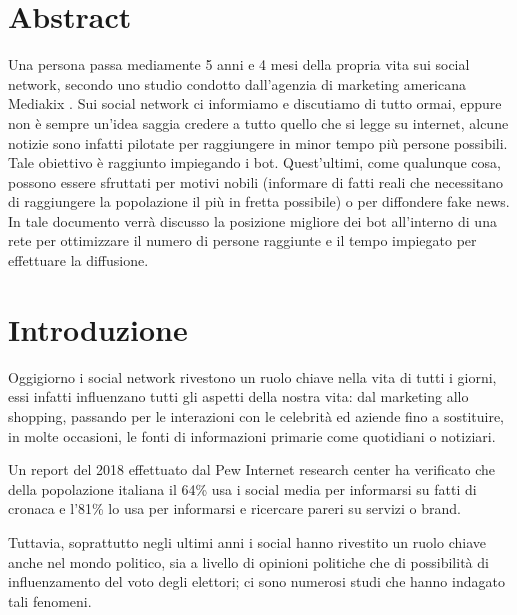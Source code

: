 \documentclass[11pt]{article}
\begin{document}
\newcommand{\CC}{C\nolinebreak\hspace{-.05em}\raisebox{.4ex}{\tiny\bf +}\nolinebreak\hspace{-.10em}\raisebox{.4ex}{\tiny\bf +}}
\def\CC{{C\nolinebreak[4]\hspace{-.05em}\raisebox{.4ex}{\tiny\bf ++}}}

\tableofcontents

\newpage

\section{Abstract}

Una persona passa mediamente 5 anni e 4 mesi della propria vita sui social network, secondo uno studio condotto dall'agenzia di marketing americana Mediakix \cite{mediakix}. Sui social network ci informiamo e discutiamo di tutto ormai, eppure non è sempre un'idea saggia credere a tutto quello che si legge su internet, alcune notizie sono infatti pilotate per raggiungere in minor tempo più persone possibili.
Tale obiettivo è raggiunto impiegando i bot. Quest’ultimi, come qualunque cosa, possono essere sfruttati per motivi nobili (informare di fatti reali che necessitano di raggiungere la popolazione il più in fretta possibile) o per diffondere fake news.
In tale documento verrà discusso la posizione migliore dei bot all’interno di una rete per ottimizzare il numero di persone raggiunte e il tempo impiegato per effettuare la diffusione.

\section{Introduzione}

Oggigiorno i social network rivestono un ruolo chiave nella vita di tutti i giorni, essi infatti influenzano tutti gli aspetti della nostra vita: dal marketing allo shopping, passando per le interazioni con le celebrità ed aziende fino a sostituire, in molte occasioni, le fonti di informazioni primarie come quotidiani o notiziari.

Un report del 2018 effettuato dal Pew Internet research center \cite{ReportPewInternetResearch2018} ha verificato che della popolazione italiana il 64\% usa i social media per informarsi su fatti di cronaca e l’81\% lo usa per informarsi e ricercare pareri su servizi o brand.

Tuttavia, soprattutto negli ultimi anni i social hanno rivestito un ruolo chiave anche nel mondo politico, sia a livello di opinioni politiche che di possibilità di influenzamento del voto degli elettori; ci sono numerosi studi che hanno indagato tali fenomeni.
\end{document}
